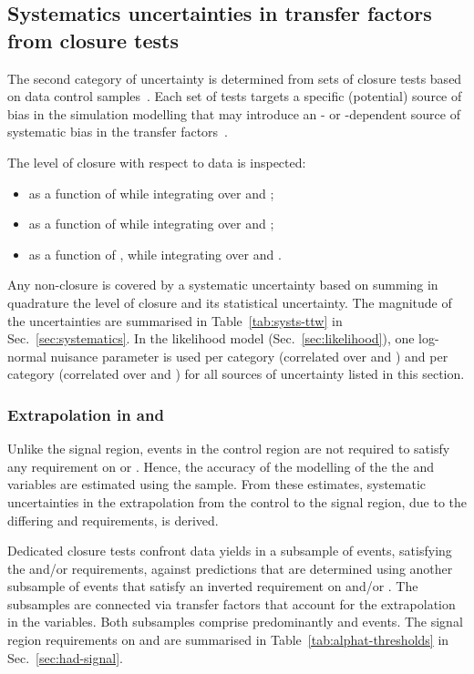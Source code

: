 \subsection{Systematics uncertainties in transfer factors from closure tests}
\label{sec:closure-tests}

The second category of uncertainty is determined from sets of closure
tests based on data control samples~\cite{RA1Paper2012}.  Each set of
tests targets a specific (potential) source of bias in the simulation
modelling that may introduce an \njet- or \scalht-dependent source of
systematic bias in the transfer factors~\cite{RA1Paper2012}.

The level of closure with respect to data is inspected:
\begin{itemize}
\item as a function of \njet while integrating over \scalht and \nb; 
\item as a function of \scalht while integrating over \njet and \nb;
\item as a function of \nb, while integrating over \njet and \scalht.
\end{itemize}
Any non-closure is covered by a systematic uncertainty based on
summing in quadrature the level of closure and its statistical
uncertainty. The magnitude of the uncertainties are summarised in
Table~\ref{tab:systs-ttw} in Sec.~\ref{sec:systematics}. In the
likelihood model (Sec.~\ref{sec:likelihood}), one log-normal nuisance
parameter is used per \scalht category (\ie correlated over \njet and
\nb) and per \njet category (\ie correlated over \scalht and \nb) for
all sources of uncertainty listed in this section.

\subsubsection{Extrapolation in \texorpdfstring{\alphat}{AlphaT} and
  \texorpdfstring{\bdphi}{biased dPhi}}
\label{sec:tfSyst_alphaT}

Unlike the signal region, events in the \mj control region are not
required to satisfy any requirement on \alphat or \bdphi. Hence, the
accuracy of the modelling of the the \alphat and \bdphi variables are
estimated using the \mj sample. From these estimates, systematic
uncertainties in the extrapolation from the control to the signal
region, due to the differing \alphat and \bdphi requirements, is
derived.

Dedicated closure tests confront data yields in a subsample of \mj
events, satisfying the \alphat and/or \bdphi requirements, against
predictions that are determined using another subsample of \mj events
that satisfy an inverted requirement on \alphat and/or \bdphi. The
subsamples are connected via transfer factors that account for the
extrapolation in the variables. Both subsamples comprise predominantly
\wj and \ttbar events. The signal region requirements on \alphat and
\bdphi are summarised in Table~\ref{tab:alphat-thresholds} in
Sec.~\ref{sec:had-signal}.

